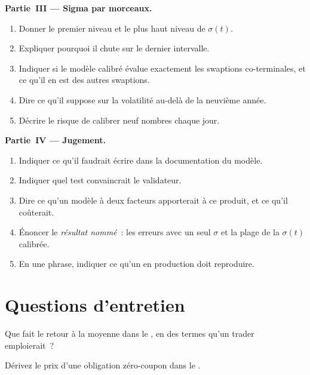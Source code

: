 \begin{problem}
\medskip\noindent\textbf{Partie~III --- Sigma par morceaux.}
\begin{enumerate}[resume]
\item Donner le premier niveau et le plus haut niveau de $\sigma(t)$.
\item Expliquer pourquoi il chute sur le dernier intervalle.
\item Indiquer si le modèle calibré évalue exactement les swaptions co-terminales, et ce qu'il en est des autres swaptions.
\item Dire ce qu'il suppose sur la volatilité au-delà de la neuvième année.
\item Décrire le risque de calibrer neuf nombres chaque jour.
\end{enumerate}

\medskip\noindent\textbf{Partie~IV --- Jugement.}
\begin{enumerate}[resume]
\item Indiquer ce qu'il faudrait écrire dans la documentation du modèle.
\item Indiquer quel test convaincrait le validateur.
\item Dire ce qu'un modèle à deux facteurs apporterait à ce produit, et ce qu'il coûterait.
\item Énoncer le \emph{résultat nommé}~: les erreurs avec un seul $\sigma$ et la plage de la
$\sigma(t)$ calibrée.
\item En une phrase, indiquer ce qu'un  en production doit reproduire.
\end{enumerate}
\end{problem}

\section{Questions d'entretien}

\begin{interviewq}\label{iq:rc:short-rate-models:1}
Que fait le retour à la moyenne dans le , en des termes qu'un trader
emploierait~?
\end{interviewq}

\begin{interviewq}\label{iq:rc:short-rate-models:2}
Dérivez le prix d'une obligation zéro-coupon dans le .
\end{interviewq}

